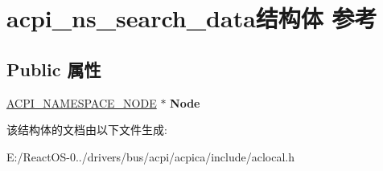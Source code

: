 \hypertarget{structacpi__ns__search__data}{}\section{acpi\+\_\+ns\+\_\+search\+\_\+data结构体 参考}
\label{structacpi__ns__search__data}
\subsection*{Public 属性}
\begin{DoxyCompactItemize}
\item 
\mbox{\label{structacpi__ns__search__data_ad688214cfc341f098acb01e0bf7ba183}} 
\hyperlink{structacpi__namespace__node}{A\+C\+P\+I\+\_\+\+N\+A\+M\+E\+S\+P\+A\+C\+E\+\_\+\+N\+O\+DE} $\ast$ {\bfseries Node}
\end{DoxyCompactItemize}


该结构体的文档由以下文件生成\+:\begin{DoxyCompactItemize}
\item 
E\+:/\+React\+O\+S-\/0../drivers/bus/acpi/acpica/include/aclocal.\+h\end{DoxyCompactItemize}
